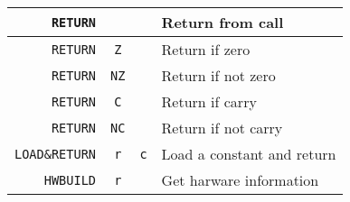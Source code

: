 \begin{table}[H]
\begin{tabular}{| r | c | c | l |}
\verb|RETURN|&\verb||&\verb||& Return from call \\ \hline
\verb|RETURN|&\verb|Z|&\verb||& Return if zero \\ \hline
\verb|RETURN|&\verb|NZ|&\verb||& Return if not zero  \\ \hline
\verb|RETURN|&\verb|C|&\verb||& Return if carry \\ \hline
\verb|RETURN|&\verb|NC|&\verb||& Return if not carry \\ \hline

\verb|LOAD&RETURN|&\verb|r|&\verb|c|& Load a constant and return \\ \hline

\verb|HWBUILD|&\verb|r|&\verb||& Get harware information\\ \hline
\end{tabular}
\end{table}


